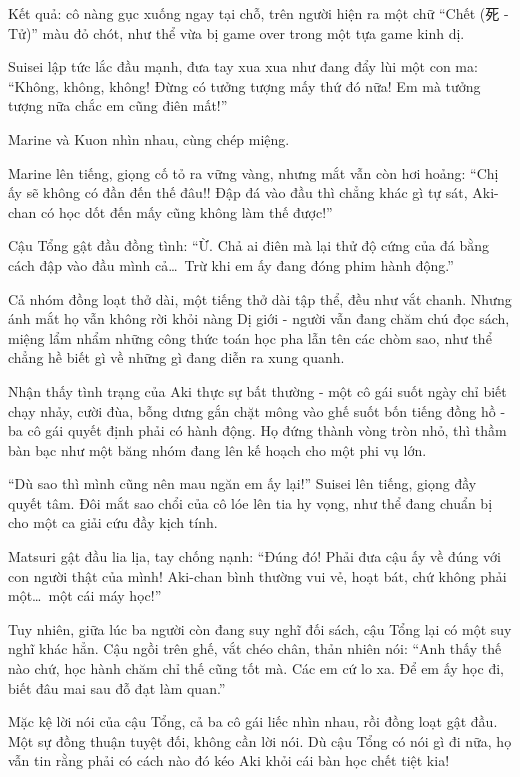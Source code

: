 \documentclass[../main.tex]{subfiles}
\begin{document}
Kết quả: cô nàng gục xuống ngay tại chỗ, trên người hiện ra một chữ ``Chết (死 - Tử)'' màu đỏ chót, như thể vừa bị game over trong một tựa game kinh dị.

Suisei lập tức lắc đầu mạnh, đưa tay xua xua như đang đẩy lùi một con ma: ``Không, không, không! Đừng có tưởng tượng mấy thứ đó nữa! Em mà tưởng tượng nữa chắc em cũng điên mất!''

Marine và Kuon nhìn nhau, cùng chép miệng.

Marine lên tiếng, giọng cố tỏ ra vững vàng, nhưng mắt vẫn còn hơi hoảng: ``Chị ấy sẽ không có đần đến thế đâu!! Đập đá vào đầu thì chẳng khác gì tự sát, Aki-chan có học dốt đến mấy cũng không làm thế được!''

Cậu Tổng gật đầu đồng tình: ``Ừ. Chả ai điên mà lại thử độ cứng của đá bằng cách đập vào đầu mình cả\dots\ Trừ khi em ấy đang đóng phim hành động.''

Cả nhóm đồng loạt thở dài, một tiếng thở dài tập thể, đều như vắt chanh. Nhưng ánh mắt họ vẫn không rời khỏi nàng Dị giới - người vẫn đang chăm chú đọc sách, miệng lẩm nhẩm những công thức toán học pha lẫn tên các chòm sao, như thể chẳng hề biết gì về những gì đang diễn ra xung quanh.

Nhận thấy tình trạng của Aki thực sự bất thường - một cô gái suốt ngày chỉ biết chạy nhảy, cười đùa, bỗng dưng gắn chặt mông vào ghế suốt bốn tiếng đồng hồ - ba cô gái quyết định phải có hành động. Họ đứng thành vòng tròn nhỏ, thì thầm bàn bạc như một băng nhóm đang lên kế hoạch cho một phi vụ lớn.

``Dù sao thì mình cũng nên mau ngăn em ấy lại!'' Suisei lên tiếng, giọng đầy quyết tâm. Đôi mắt sao chổi của cô lóe lên tia hy vọng, như thể đang chuẩn bị cho một ca giải cứu đầy kịch tính.

Matsuri gật đầu lia lịa, tay chống nạnh: ``Đúng đó! Phải đưa cậu ấy về đúng với con người thật của mình! Aki-chan bình thường vui vẻ, hoạt bát, chứ không phải một\dots\ một cái máy học!''

Tuy nhiên, giữa lúc ba người còn đang suy nghĩ đối sách, cậu Tổng lại có một suy nghĩ khác hẳn. Cậu ngồi trên ghế, vắt chéo chân, thản nhiên nói: ``Anh thấy thế nào chứ, học hành chăm chỉ thế cũng tốt mà. Các em cứ lo xa. Để em ấy học đi, biết đâu mai sau đỗ đạt làm quan.''

Mặc kệ lời nói của cậu Tổng, cả ba cô gái liếc nhìn nhau, rồi đồng loạt gật đầu. Một sự đồng thuận tuyệt đối, không cần lời nói. Dù cậu Tổng có nói gì đi nữa, họ vẫn tin rằng phải có cách nào đó kéo Aki khỏi cái bàn học chết tiệt kia!
\end{document}
